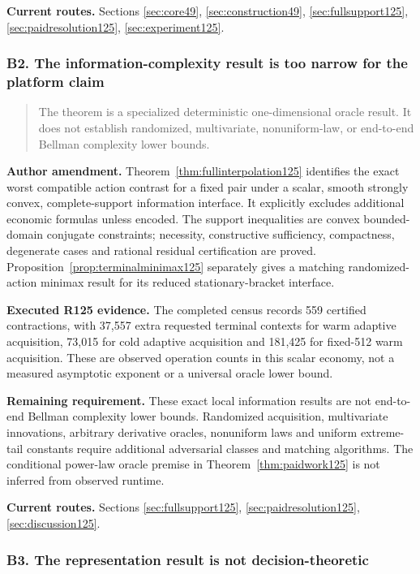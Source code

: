 \noindent\textbf{Current routes.} Sections \ref{sec:core49}, \ref{sec:construction49}, \ref{sec:fullsupport125}, \ref{sec:paidresolution125}, \ref{sec:experiment125}.

\subsubsection{B2. The information-complexity result is too narrow for the platform claim}

\begin{quote}\small
The theorem is a specialized deterministic one-dimensional oracle result. It does not establish randomized, multivariate, nonuniform-law, or end-to-end Bellman complexity lower bounds.
\end{quote}

\noindent\textbf{Author amendment.} Theorem~\ref{thm:fullinterpolation125} identifies the exact worst compatible action contrast for a fixed pair under a scalar, smooth strongly convex, complete-support information interface. It explicitly excludes additional economic formulas unless encoded. The support inequalities are convex bounded-domain conjugate constraints; necessity, constructive sufficiency, compactness, degenerate cases and rational residual certification are proved. Proposition~\ref{prop:terminalminimax125} separately gives a matching randomized-action minimax result for its reduced stationary-bracket interface.

\noindent\textbf{Executed R125 evidence.} The completed census records 559 certified contractions, with 37,557 extra requested terminal contexts for warm adaptive acquisition, 73,015 for cold adaptive acquisition and 181,425 for fixed-512 warm acquisition. These are observed operation counts in this scalar economy, not a measured asymptotic exponent or a universal oracle lower bound.

\noindent\textbf{Remaining requirement.} These exact local information results are not end-to-end Bellman complexity lower bounds. Randomized acquisition, multivariate innovations, arbitrary derivative oracles, nonuniform laws and uniform extreme-tail constants require additional adversarial classes and matching algorithms. The conditional power-law oracle premise in Theorem~\ref{thm:paidwork125} is not inferred from observed runtime.

\noindent\textbf{Current routes.} Sections \ref{sec:fullsupport125}, \ref{sec:paidresolution125}, \ref{sec:discussion125}.

\subsubsection{B3. The representation result is not decision-theoretic}

